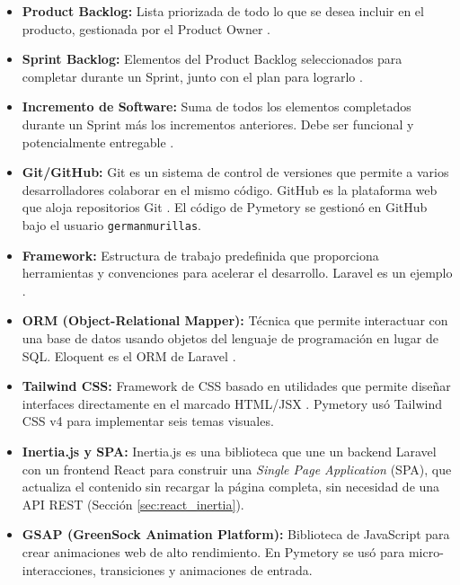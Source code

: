 \begin{itemize}
    \item \textbf{Product Backlog:} Lista priorizada de todo lo que se desea incluir en el producto, gestionada por el Product Owner \cite{schwaber2020scrumguide}.
    
    \item \textbf{Sprint Backlog:} Elementos del Product Backlog seleccionados para completar durante un Sprint, junto con el plan para lograrlo \cite{schwaber2020scrumguide}.
    
    \item \textbf{Incremento de Software:} Suma de todos los elementos completados durante un Sprint más los incrementos anteriores. Debe ser funcional y potencialmente entregable \cite{schwaber2020scrumguide}.
    
    \item \textbf{Git/GitHub:} Git es un sistema de control de versiones que permite a varios desarrolladores colaborar en el mismo código. GitHub es la plataforma web que aloja repositorios Git \cite{chacon2014progit}. El código de Pymetory se gestionó en GitHub bajo el usuario \texttt{germanmurillas}.
    
    \item \textbf{Framework:} Estructura de trabajo predefinida que proporciona herramientas y convenciones para acelerar el desarrollo. Laravel es un ejemplo \cite{laraveldocs}.
    
    \item \textbf{ORM (Object-Relational Mapper):} Técnica que permite interactuar con una base de datos usando objetos del lenguaje de programación en lugar de SQL. Eloquent es el ORM de Laravel \cite{fowler2002poeaa}.
    
    \item \textbf{Tailwind CSS:} Framework de CSS basado en utilidades que permite diseñar interfaces directamente en el marcado HTML/JSX \cite{tailwindcss}. Pymetory usó Tailwind CSS v4 para implementar seis temas visuales.
    
    \item \textbf{Inertia.js y SPA:} Inertia.js es una biblioteca que une un backend Laravel con un frontend React para construir una \textit{Single Page Application} (SPA), que actualiza el contenido sin recargar la página completa, sin necesidad de una API REST (Sección \ref{sec:react_inertia}).
    
    \item \textbf{GSAP (GreenSock Animation Platform):} Biblioteca de JavaScript para crear animaciones web de alto rendimiento. En Pymetory se usó para micro-interacciones, transiciones y animaciones de entrada.
    

\end{itemize}
